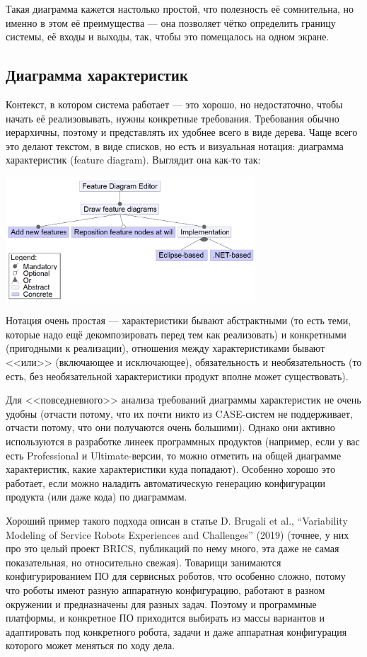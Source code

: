 \documentclass[a5paper]{article}
\begin{document}
Такая диаграмма кажется настолько простой, что полезность её сомнительна, но именно в этом её преимущества --- она позволяет чётко определить границу системы, её входы и выходы, так, чтобы это помещалось на одном экране.

\subsection{Диаграмма характеристик}

Контекст, в котором система работает --- это хорошо, но недостаточно, чтобы начать её реализовывать, нужны конкретные требования. Требования обычно иерархичны, поэтому и представлять их удобнее всего в виде дерева. Чаще всего это делают текстом, в виде списков, но есть и визуальная нотация: диаграмма характеристик (feature diagram). Выглядит она как-то так:

\begin{center}
    \includegraphics[width=0.7\textwidth]{featureDiagram.png}
\end{center}

Нотация очень простая --- характеристики бывают абстрактными (то есть теми, которые надо ещё декомпозировать перед тем как реализовать) и конкретными (пригодными к реализации), отношения между характеристиками бывают <<или>> (включающее и исключающее), обязательность и необязательность (то есть, без необязательной характеристики продукт вполне может существовать).

Для <<повседневного>> анализа требований диаграммы характеристик не очень удобны (отчасти потому, что их почти никто из CASE-систем не поддерживает, отчасти потому, что они получаются очень большими). Однако они активно используются в разработке линеек программных продуктов (например, если у вас есть Professional и Ultimate-версии, то можно отметить на общей диаграмме характеристик, какие характеристики куда попадают). Особенно хорошо это работает, если можно наладить автоматическую генерацию конфигурации продукта (или даже кода) по диаграммам.

Хороший пример такого подхода описан в статье D. Brugali et al., ``Variability Modeling of Service Robots Experiences and Challenges'' (2019) (точнее, у них про это целый проект BRICS, публикаций по нему много, эта даже не самая показательная, но относительно свежая). Товарищи занимаются конфигурированием ПО для сервисных роботов, что особенно сложно, потому что роботы имеют разную аппаратную конфигурацию, работают в разном окружении и предназначены для разных задач. Поэтому и программные платформы, и конкретное ПО приходится выбирать из массы вариантов и адаптировать под конкретного робота, задачи и даже аппаратная конфигурация которого может меняться по ходу дела.
\end{document}
